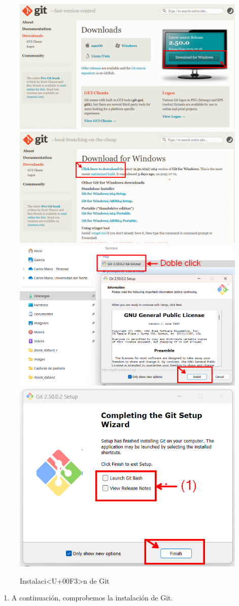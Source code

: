 \documentclass[
]{book}
\providecommand{\tightlist}{%
  \setlength{\itemsep}{0pt}\setlength{\parskip}{0pt}}
\begin{document}
\begin{figure}

{\centering \includegraphics[width=0.48\linewidth]{images/git1} \includegraphics[width=0.48\linewidth]{images/git2} \includegraphics[width=0.48\linewidth]{images/git3} \includegraphics[width=0.48\linewidth]{images/git4} 

}

\caption{Instalaci<U+00F3>n de Git}\label{fig:git-inst-fig}
\end{figure}

\begin{enumerate}
\def\labelenumi{\arabic{enumi}.}
\setcounter{enumi}{2}
\tightlist
\item
  A continuación, comprobemos la instalación de Git.
\end{enumerate}
\end{document}

